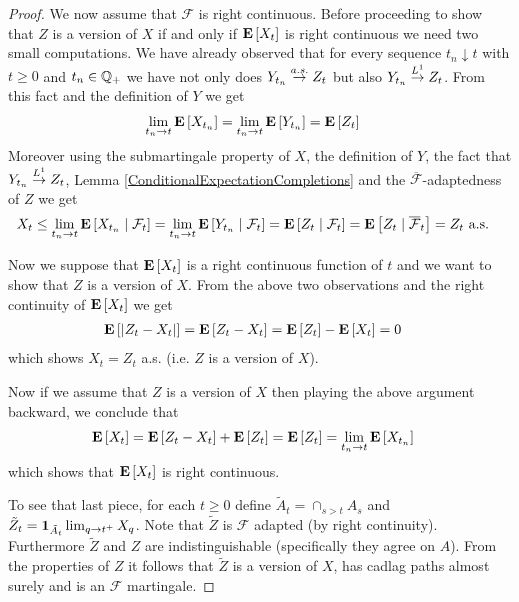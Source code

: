 \begin{proof}
We now assume that $\mathcal{F}$ is right continuous.  Before
proceeding to show that $Z$ is a version of $X$ if and only if
$\expectation{X_t}$ is right continuous we need two small computations.
We have already observed that for every sequence $t_n \downarrow t$ with $t
\geq 0$ and $t_n \in \rationals_+$ we have 
not only does $Y_{t_n} \toas Z_t$ but also $Y_{t_n} \tolp{1}
Z_t$. From this fact and the definition of $Y$ we get
\begin{align*}
\lim_{t_n \to t} \expectation{X_{t_n}} &= \lim_{t_n \to
  t}\expectation{Y_{t_n}} = \expectation{Z_t}
\end{align*}
Moreover using the submartingale property of $X$, the definition of
$Y$, the fact that $Y_{t_n} \tolp{1} Z_t$, Lemma \ref{ConditionalExpectationCompletions} and the
$\overline{\mathcal{F}}$-adaptedness of $Z$ we get
\begin{align*}
X_t &\leq \lim_{t_n \to t} \cexpectationlong{\mathcal{F}_t}{X_{t_n}} =
\lim_{t_n \to t} \cexpectationlong{\mathcal{F}_t}{Y_{t_n}} =
\cexpectationlong{\mathcal{F}_t}{Z_t} =\cexpectationlong{\overline{\mathcal{F}}_t}{Z_t} = Z_t \text{ a.s.}
\end{align*}

Now we suppose that $\expectation{X_t}$ is a right continuous function
of $t$ and we want to show that $Z$ is a version of $X$.  From the
above two observations and the right continuity of $\expectation{X_t}$
we get
\begin{align*}
\expectation{\abs{Z_t - X_t}} &= \expectation{Z_t - X_t} =
\expectation{Z_t} - \expectation{X_t} = 0
\end{align*}
which shows $X_t = Z_t$ a.s. (i.e. $Z$ is a version of $X$).

Now if we assume that $Z$ is a version of $X$ then playing the above
argument backward, we conclude that 
\begin{align*}
\expectation{X_t} &= \expectation{Z_t - X_t}  + \expectation{Z_t} =
\expectation{Z_t} = \lim_{t_n \to t} \expectation{X_{t_n}}
\end{align*}
which shows that $\expectation{X_t}$ is right continuous.

To see that last piece, for each $t \geq 0$ define $\tilde{A}_t =
\cap_{s > t} A_s$ and 
$\tilde{Z}_t = \characteristic{\tilde{A}_t} \lim_{q \to t^+} X_q$.  Note that
$\tilde{Z}$ is $\mathcal{F}$ adapted (by right continuity).
Furthermore $\tilde{Z}$ and $Z$ are indistinguishable (specifically they agree on
$A$). From the properties of $Z$ it follows that $\tilde{Z}$ is a
version of $X$, has cadlag paths almost surely and is an $\mathcal{F}$ martingale.
\end{proof}
